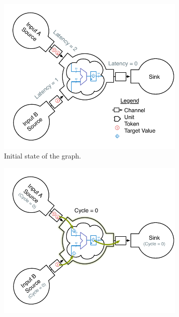 \begin{figure}
    \centering
    \begin{subfigure}[t]{0.49\textwidth}
        \captionsetup{margin=0.25cm}
        \includegraphics[width=\columnwidth]{figures/adder-example1.pdf}
        \caption{Initial state of the graph.}
    \end{subfigure}
    \begin{subfigure}[t]{0.49\textwidth}
        \captionsetup{margin=0.25cm}
        \includegraphics[width=\columnwidth]{figures/adder-example2.pdf}

\end{subfigure}
\end{figure}
